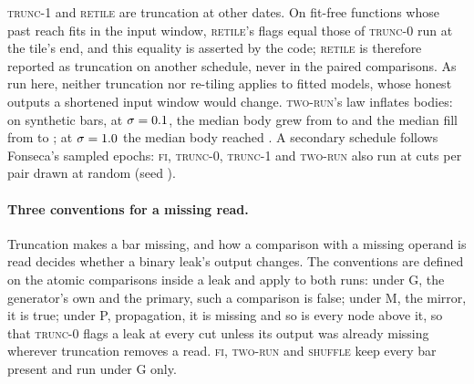 \documentclass[11pt]{article}
\newcommand{\FI}{\textsc{fi}}
\newcommand{\TZ}{\textsc{trunc-0}}
\newcommand{\TO}{\textsc{trunc-1}}
\newcommand{\RT}{\textsc{retile}}
\newcommand{\TR}{\textsc{two-run}}
\newcommand{\SH}{\textsc{shuffle}}
\begin{document}
\TO{} and \RT{} are truncation at other dates. On fit-free functions whose past reach fits in the
input window, \RT's flags equal those of \TZ{} run at the tile's end, and this equality is asserted
by the code; \RT{} is therefore reported as truncation on another schedule, never in the paired
comparisons. As run here, neither truncation nor re-tiling applies to fitted models, whose honest
outputs a shortened input window would change. \TR's law inflates bodies: on synthetic bars, at
$\sigma=0.1$, the median body grew from \NumBodyBefore{} to \NumBodyAfter{} and the median
fill from \NumFillBefore{} to \NumFillAfter; at $\sigma=1.0$ the median body reached
\NumBodyHiSigma. A secondary schedule follows Fonseca's sampled epochs: \FI, \TZ, \TO{} and \TR{}
also run at \NumLongPerPair{} cuts per pair drawn at random (seed \NumLongCutSeed).

\paragraph{Three conventions for a missing read.} Truncation makes a bar missing, and how a
comparison with a missing operand is read decides whether a binary leak's output changes. The
conventions are defined on the atomic comparisons inside a leak and apply to both runs: under G,
the generator's own and the primary, such a comparison is false; under M, the mirror, it is true;
under P, propagation, it is missing and so is every node above it, so that \TZ{} flags a leak at
every cut unless its output was already missing wherever truncation removes a read. \FI, \TR{} and \SH{} keep every bar present
and run under G only.
\end{document}
